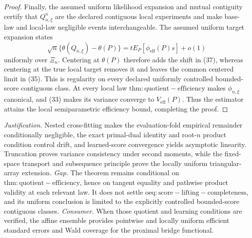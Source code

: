 \documentclass{article}
\begin{document}
\begin{proof}
Finally, the assumed uniform likelihood expansion and mutual contiguity certify that \(Q_{n,\xi}^n\) are the declared contiguous local experiments and make base-law and local-law negligible events interchangeable.  The assumed uniform target expansion states
\[
 \sqrt n\{\theta(Q_{n,\xi})-\theta(P)\}
 =tE_P[\phi_{\mathrm{eff}}(P)s]+o(1)                                      \tag{37}
\]
uniformly over \(\Xi_n\).  Centering at \(\theta(P)\) therefore adds the shift in (37), whereas centering at the true local target removes it and leaves the common centered limit in (35).  This is regularity on every declared uniformly controlled bounded-score contiguous class.  At every local law \(\mathrm{thm:quotient-efficiency}\) makes \(\phi_{n,\xi}\) canonical, and (33) makes its variance converge to \(V_{\mathrm{eff}}(P)\).  Thus the estimator attains the local semiparametric efficiency bound, completing the proof.
\end{proof}
\par\smallskip\noindent \textit{Justification.} Nested cross-fitting makes the evaluation-fold empirical remainder conditionally negligible, the exact primal-dual identity and root-\(n\) product condition control drift, and learned-score convergence yields asymptotic linearity. Truncation proves variance consistency under second moments, while the fixed-space transport and subsequence principle prove the locally uniform triangular-array extension. \textit{Gap.} The theorem remains conditional on \(\mathrm{thm:quotient-efficiency}\), hence on tangent equality and pathwise product validity at each relevant law. It does not settle \(\mathrm{oeq:score-lifting-completeness}\), and its uniform conclusion is limited to the explicitly controlled bounded-score contiguous classes. \textit{Consumer.} When those quotient and learning conditions are verified, the affine ensemble provides pointwise and locally uniform efficient standard errors and Wald coverage for the proximal bridge functional.
\end{document}
